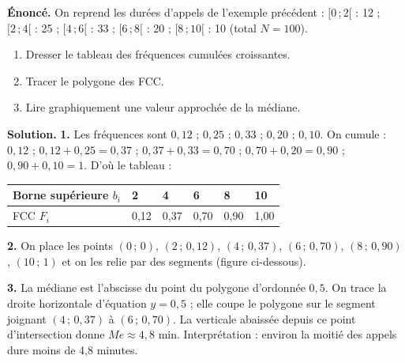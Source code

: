 \documentclass[11pt]{article}
\begin{document}
\begin{exoresolu}
\textbf{Énoncé.} On reprend les durées d'appels de l'exemple précédent :
$[0\,;2[$ : 12 ; $[2\,;4[$ : 25 ; $[4\,;6[$ : 33 ; $[6\,;8[$ : 20 ; $[8\,;10[$ : 10 (total $N = 100$).
\begin{enumerate}
\item Dresser le tableau des fréquences cumulées croissantes.
\item Tracer le polygone des FCC.
\item Lire graphiquement une valeur approchée de la médiane.
\end{enumerate}
\tcblower
\textbf{Solution.}
\textbf{1.} Les fréquences sont $0{,}12$ ; $0{,}25$ ; $0{,}33$ ; $0{,}20$ ; $0{,}10$. On cumule : $0{,}12$ ; $0{,}12+0{,}25 = 0{,}37$ ; $0{,}37+0{,}33 = 0{,}70$ ; $0{,}70+0{,}20 = 0{,}90$ ; $0{,}90+0{,}10 = 1$. D'où le tableau :
\begin{center}
\begin{tabularx}{\linewidth}{|l|*{5}{X|}}\hline
\rowcolor{popblueL} Borne supérieure $b_i$ & 2 & 4 & 6 & 8 & 10 \\\hline
FCC $F_i$ & 0,12 & 0,37 & 0,70 & 0,90 & 1,00 \\\hline
\end{tabularx}
\end{center}
\textbf{2.} On place les points $(0\,;\,0)$, $(2\,;\,0{,}12)$, $(4\,;\,0{,}37)$, $(6\,;\,0{,}70)$, $(8\,;\,0{,}90)$, $(10\,;\,1)$ et on les relie par des segments (figure ci-dessous).

\textbf{3.} La médiane est l'abscisse du point du polygone d'ordonnée $0{,}5$. On trace la droite horizontale d'équation $y = 0{,}5$ ; elle coupe le polygone sur le segment joignant $(4\,;\,0{,}37)$ à $(6\,;\,0{,}70)$. La verticale abaissée depuis ce point d'intersection donne $Me \approx 4{,}8$ min. Interprétation : environ la moitié des appels dure moins de 4,8 minutes.
\end{exoresolu}
\end{document}
